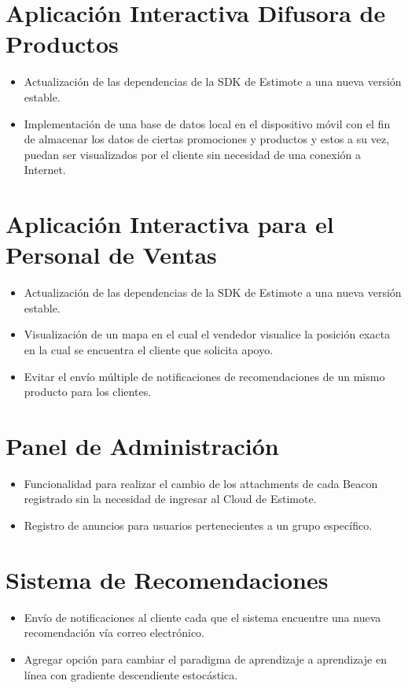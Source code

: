 \section{Aplicación Interactiva Difusora de Productos}
\begin{itemize}
\item Actualización de las dependencias de la SDK de Estimote a una nueva versión estable.
\item Implementación de una base de datos local en el dispositivo móvil con el fin de almacenar los datos de ciertas promociones y productos y estos a su vez, puedan ser visualizados por el cliente sin necesidad de una conexión a Internet.
\end{itemize}
\section{Aplicación Interactiva para el Personal de Ventas}
\begin{itemize}
\item Actualización de las dependencias de la SDK de Estimote a una nueva versión estable.
\item Visualización de un mapa en el cual el vendedor visualice la posición exacta en la cual se encuentra el cliente que solicita apoyo.
\item Evitar el envío múltiple de notificaciones de recomendaciones de un mismo producto para los clientes.
\end{itemize}
\section{Panel de Administración}
\begin{itemize}
\item Funcionalidad para realizar el cambio de los attachments de cada Beacon registrado sin la necesidad de ingresar al Cloud de Estimote.
\item Registro de anuncios para usuarios pertenecientes a un grupo específico.
\end{itemize}
\section{Sistema de Recomendaciones}
\begin{itemize}
\item Envío de notificaciones al cliente cada que el sistema encuentre una nueva recomendación vía correo electrónico.
\item Agregar opción para cambiar el paradigma de aprendizaje a aprendizaje en línea con gradiente descendiente estocástica.
\end{itemize}